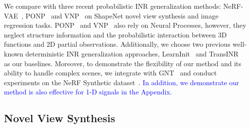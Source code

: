 

We compare \method{} with three recent probabilistic INR generalization methods: NeRF-VAE~\citep{kosiorek2021nerf}, PONP~\citep{gu2023generalizable} and VNP~\citep{guo2023versatile} on ShapeNet novel view synthesis and image regression tasks.
PONP~\citep{gu2023generalizable} and VNP~\citep{guo2023versatile} also rely on Neural Processes, however, they neglect structure information and the probabilistic interaction between 3D functions and 2D partial observations. Additionally, we choose two previous well-known deterministic INR generalization approaches, LearnInit~\citep{tancik2021learned} and  TransINR~\citep{chen2022transformers} as our baselines. Moreover, to demonstrate the flexibility of our method and its ability to handle complex scenes, we integrate \method{} with GNT~\citep{wang2022attention} and conduct experiments on the NeRF Synthetic dataset~\citep{mildenhall2021nerf}. \textcolor{blue}{In addition, we demonstrate our method is also effective for 1-D signals in the Appendix.}




\subsection{Novel View Synthesis}
\label{sec:nerf-results}

